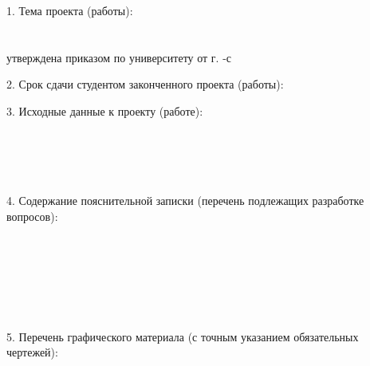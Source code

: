 {  1. Тема проекта (работы):
  \lineunderscore\\
  \lineunderscore\\
  \lineunderscore\\
  утверждена приказом по университету от \uline{\hspace*{1.5em}} \uline{\hspace*{5em}} \currentYear{} г.  \No{} \uline{\hspace*{2em}}-с

  \vspace{1em}

  2. Срок сдачи студентом законченного проекта (работы): \lineunderscore

  \vspace{1em}

  3. Исходные данные к проекту (работе):
  \lineunderscore\\
  \lineunderscore\\
  \lineunderscore\\
  \lineunderscore\\
  \lineunderscore\\
  \lineunderscore

  \vspace{1em}

  4. Содержание пояснительной записки (перечень подлежащих разработке вопросов):
  \lineunderscore\\
  \lineunderscore\\
  \lineunderscore\\
  \lineunderscore\\
  \lineunderscore\\
  \lineunderscore\\
  \lineunderscore\\
  \lineunderscore

  \clearpage
  \thispagestyle{empty}

  5. Перечень графического материала (с точным указанием обязательных чертежей):
  \lineunderscore\\
  \lineunderscore\\
  \lineunderscore\\
  \lineunderscore\\
  \lineunderscore\\
  \lineunderscore\\
  \lineunderscore\\
  \lineunderscore

  \vspace{1em}

}
